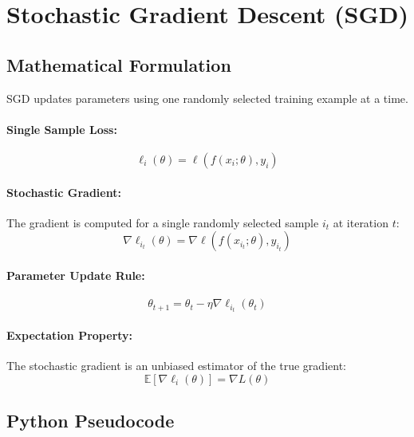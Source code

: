 \documentclass{tufte-handout}
\begin{document}
\section{Stochastic Gradient Descent (SGD)}

\subsection{Mathematical Formulation}

SGD updates parameters using one randomly selected training example at a time.

\paragraph{Single Sample Loss:}
\begin{equation}
\ell_i(\theta) = \ell(f(x_i; \theta), y_i)
\end{equation}

\paragraph{Stochastic Gradient:}
The gradient is computed for a single randomly selected sample $i_t$ at iteration $t$:
\begin{equation}
\nabla \ell_{i_t}(\theta) = \nabla \ell(f(x_{i_t}; \theta), y_{i_t})
\end{equation}

\paragraph{Parameter Update Rule:}
\begin{equation}
\theta_{t+1} = \theta_t - \eta \nabla \ell_{i_t}(\theta_t)
\end{equation}

\paragraph{Expectation Property:}
The stochastic gradient is an unbiased estimator of the true gradient:
\begin{equation}
\mathbb{E}[\nabla \ell_i(\theta)] = \nabla L(\theta)
\end{equation}

\subsection{Python Pseudocode}
\end{document}
